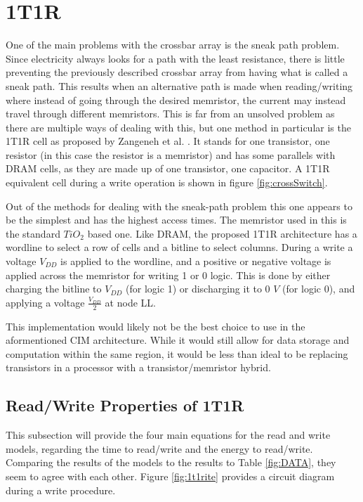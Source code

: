 \documentclass{sig-alternate}
\begin{document}
\section{1T1R}
\label{sec1t1r}
One of the main problems with the crossbar array is the sneak path problem.  Since electricity always looks for a path with the least resistance, there is little preventing the previously described crossbar array from having what is called a sneak path.  This results when an alternative path is made when reading/writing where instead of going through the desired memristor, the current may instead travel through different memristors.  This is far from an unsolved problem as there are multiple ways of dealing with this, but one method in particular is the 1T1R cell as proposed by Zangeneh et al. \cite{Zangeneh:2012:PEM:2206781.2206786}.  It stands for one transistor, one resistor (in this case the resistor is a memristor) and has some parallels with DRAM cells, as they are made up of one transistor, one capacitor.  A 1T1R equivalent cell during a write operation is shown in figure \ref{fig:crossSwitch}.  

Out of the methods for dealing with the sneak-path problem this one appears to be the simplest and has the highest access times.  The memristor used in this is the standard $TiO_2$ based one.
Like DRAM, the proposed 1T1R architecture has a wordline to select a row of cells and a bitline to select columns.  During a write a voltage $V_{DD}$ is applied to the wordline, and a positive or negative voltage is applied across the memristor for writing 1 or 0 logic.  This is done by either charging the bitline to $V_{DD}$ (for logic 1) or discharging it to 0 $V$ (for logic 0), and applying a voltage $\frac {V_{DD}}{2}$ at node LL.

This implementation would likely not be the best choice to use in the aformentioned CIM architecture.  While it would still allow for data storage and computation within the same region, it would be less than ideal to be replacing transistors in a processor with a transistor/memristor hybrid.  

\subsection{Read/Write Properties of 1T1R}
This subsection will provide the four main equations for the read and write models, regarding the time to read/write and the energy to read/write.  Comparing the results of the models to the results to Table \ref{fig:DATA}, they seem to agree with each other.  Figure \ref{fig:1t1rite} provides a circuit diagram during a write procedure.  
\end{document}
